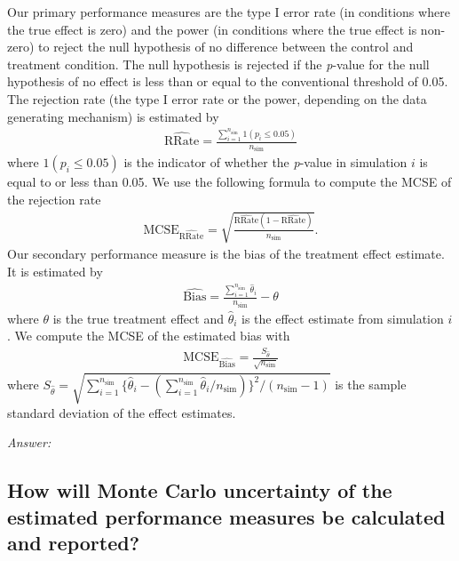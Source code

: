 \documentclass[12pt]{article}
\begin{document}
\begin{examplebox}
Our primary performance measures are the type I error rate (in conditions where the true effect is zero) and the power (in conditions where the true effect is non-zero) to reject the null hypothesis of no difference between the control and treatment condition. The null hypothesis is rejected if the \textit{p}-value for the null hypothesis of no effect is less than or equal to the conventional threshold of 0.05. The rejection rate (the type I error rate or the power, depending on the data generating mechanism) is estimated by 
\begin{align*}
   \widehat{\text{RRate}} = \frac{\sum_{i=1}^{n_{\text{sim}}} 1(p_i \leq 0.05)}{n_{\text{sim}}}
\end{align*}
where $1(p_i \leq 0.05)$ is the indicator of whether the \textit{p}-value in simulation $i$ is equal to or less than 0.05. We use the following formula to compute the MCSE of the rejection rate
\begin{align*}
    \text{MCSE}_{\widehat{\text{RRate}}} = \sqrt{\frac{\widehat{\text{RRate}} (1 - \widehat{\text{RRate}})}{n_{\text{sim}}}}.
\end{align*}
Our secondary performance measure is the bias of the treatment effect estimate. It is estimated by 
\begin{align*}
   \widehat{\text{Bias}} = \frac{\sum_{i=1}^{n_{\text{sim}}} \hat{\theta}_i}{n_{\text{sim}}} - \theta
\end{align*}
where $\theta$ is the true treatment effect and $\hat{\theta}_i$ is the effect estimate from simulation $i$. We compute the MCSE of the estimated bias with
\begin{align*}
    \text{MCSE}_{\widehat{\text{Bias}}} = \frac{S_{\hat{\theta}}}{\sqrt{n_{\text{sim}}}}
\end{align*}
where $S_{\hat{\theta}} = \sqrt{\sum_{i=1}^{n_{\text{sim}}}{ \{\hat{\theta}_i - (\sum_{i=1}^{n_{\text{sim}}}\hat{\theta}_i/n_{\text{sim}})\}^2}/(n_{\text{sim}} - 1)}$ is the sample standard deviation of the effect estimates.
\end{examplebox}

\textit{Answer:}

\subsection{How will Monte Carlo uncertainty of the estimated performance measures be calculated and reported?} 
    
\end{document}
